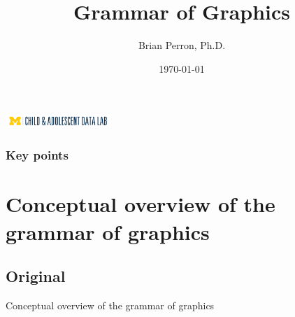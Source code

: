 \documentclass{beamer}
\begin{document}
\title{Grammar of Graphics}  
\author{Brian Perron, Ph.D.}
\date{\today} 

\begin{frame}
\titlepage
	\begin{center}
		\includegraphics[width=40mm,scale=0.5]{datalab.png}
	\end{center}
\end{frame}

\begin{frame}\frametitle{Key points}
\tableofcontents[hideallsubsections]
\end{frame} 






\section[Overview of the grammar]{Conceptual overview of the grammar of graphics}
\subsection{Original}

\begin{frame}
\begin{center}
Conceptual overview of the grammar of graphics
\end{center}
\end{frame}

\end{document}
